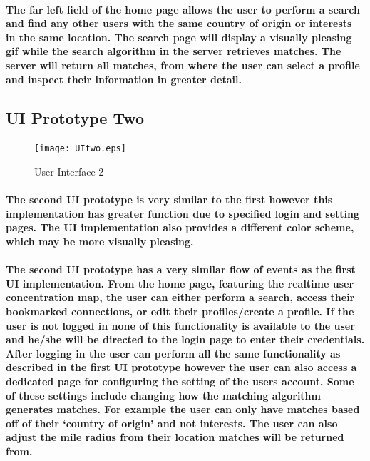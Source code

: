 \documentclass[12pt]{article}
\begin{document}
  \paragraph{\normalfont \indent The far left field of the home page allows the user to perform a search and find any other users with the same country of origin or interests in the same location. The search page will display a visually pleasing gif while the search algorithm in the server retrieves matches. The server will return all matches, from where the user can select a profile and inspect their information in greater detail.
  }


\newpage
  \subsection{\bf UI Prototype Two}

      \begin{figure}[H]
              \texttt{[image: UItwo.eps]}
              \caption{User Interface 2}
              \label{fig: User Interface 2}
      \end{figure}

    \paragraph{\normalfont \indent The second UI prototype is very similar to the first however this implementation has greater function due to specified login and setting pages. The UI implementation also provides a different color scheme, which may be more visually pleasing.
    }
    \paragraph{\normalfont \indent The second UI prototype has a very similar flow of events as the first UI implementation. From the home page, featuring the realtime user concentration map, the user can either perform a search, access their bookmarked connections, or edit their profiles/create a profile. If the user is not logged in none of this functionality is available to the user and he/she will be directed to the login page to enter their credentials. After logging in the user can perform all the same functionality as described in the first UI prototype however the user can also access a dedicated page for configuring the setting of the users account. Some of these settings include changing how the matching algorithm generates matches. For example the user can only have matches based off of their ‘country of origin’ and not interests. The user can also adjust the mile radius from their location matches will be returned from.
    }
\end{document}
